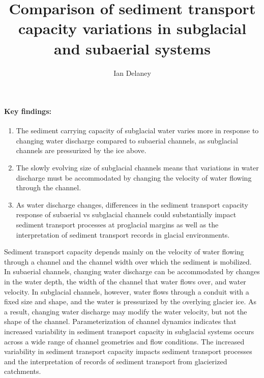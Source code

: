 \documentclass[11pt]{article}
\author[1]{Ian Delaney}
\affil[1]{Institut des dynamiques de la surface terrestre (IDYST), Universit\'{e} de Lausanne


 B\^{a}timent G\'{e}opolis, CH-1015 Lausanne}
\title{Comparison of sediment transport capacity variations in subglacial and subaerial systems }
\newcommand{\marie}[1]{{\textbf{\color{green}Marie says:} \color{green} #1} }
\begin{document}
\maketitle

\paragraph{Key findings:}
\begin{enumerate}
\item The sediment carrying capacity of subglacial water varies more in response to changing water discharge compared to subaerial channels, as subglacial channels are pressurized by the ice above.
\item The slowly evolving size of subglacial channels means that variations in water discharge must be accommodated by changing the velocity of water flowing through the channel.
\item  As water discharge changes, differences in the sediment transport capacity response of subaerial vs subglacial channels  could substantially  impact sediment transport processes at proglacial margins as well as the interpretation of sediment transport records in glacial environments. 
\end{enumerate}

\abstract %
Sediment transport capacity depends mainly on the velocity of water flowing through a channel and the channel width over which the sediment is mobilized.
In subaerial channels, changing water discharge can be accommodated by changes in the water depth, the width of the channel that  water flows over, and water velocity.
In subglacial channels, however, water flows through a conduit with a fixed size and shape, and the water is pressurized by the overlying glacier ice.
As a result, changing water discharge may modify the water velocity, but not the  shape of the channel.
Parameterization of channel dynamics indicates that increased variability in sediment transport capacity in subglacial systems occurs across a wide range of channel geometries and flow conditions.
The increased variability in sediment transport capacity impacts sediment transport processes and the interpretation of records of sediment transport from glacierized catchments.  %
\end{document}
